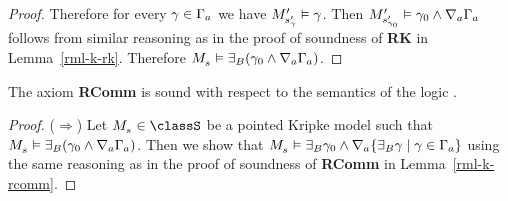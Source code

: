 \begin{proof}
Therefore for every $\gamma \in \Gamma_a$ we have ${M^{\prime}_{{s}^{\prime}_\gamma}} \vDash \gamma$.
Then ${M^{\prime}_{{s}^{\prime}_{\gamma_0}}} \vDash \gamma_0 \land \nabla_{a} \Gamma_a$ follows from similar reasoning as in the proof of soundness of {\bf RK} in Lemma~\ref{rml-k-rk}.
Therefore $\kPModel{\kStateS} \entails \somerefsBs (\gamma_0 \land \coversA \Gamma_\agentA)$.
\end{proof}

\begin{lemma}
The axiom {\bf RComm} is sound with respect to the semantics of the logic \logicRmlS{}.
\end{lemma}

\begin{proof}
($\Rightarrow$)
Let $\kPModel{\kStateS} \in \classS$ be a pointed Kripke model such that $\kPModel{\kStateS} \entails \somerefsBs (\gamma_0 \land \coversA \Gamma_\agentA)$.
Then we show that $\kPModel{\kStateS} \entails \somerefsBs \gamma_0 \land \coversA \{\somerefsBs \gamma \mid \gamma \in \Gamma_\agentA\}$ using the same reasoning as in the proof of soundness of {\bf RComm} in Lemma~\ref{rml-k-rcomm}.


\end{proof}
